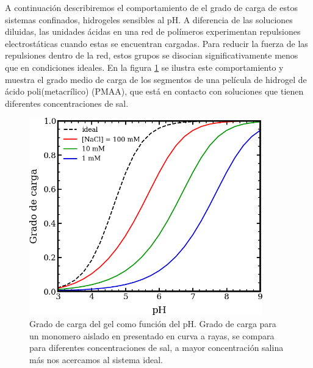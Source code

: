 A continuaci\'on describiremos el comportamiento de el grado de  carga de estos sistemas confinados, hidrogeles sensibles al pH.  A diferencia de las soluciones diluidas, las unidades \'acidas en una red de pol\'imeros experimentan repulsiones electrost\'aticas cuando estas se encuentran cargadas. Para reducir la fuerza de las repulsiones dentro de la red, estos grupos se disocian significativamente menos que en condiciones ideales. En la figura \ref{fig:degree-film} se ilustra este comportamiento y muestra el grado medio de carga de los segmentos de una pel\'icula de hidrogel de \'acido poli(metacr\'ilico) (PMAA), que est\'a en contacto con soluciones que tienen diferentes concentraciones de sal.
\begin{figure}
    \centering
    \includegraphics[width=0.9\textwidth]{Figures/graph-film/charge_degree-film.png}
    \caption{Grado de carga del gel como funci\'on del pH. Grado de carga para un monomero aislado en presentado en curva a rayas, se compara para diferentes concentraciones de sal, a mayor concentraci\'on salina m\'as nos acercamos al sistema ideal.}
    \label{fig:degree-film}
\end{figure}




